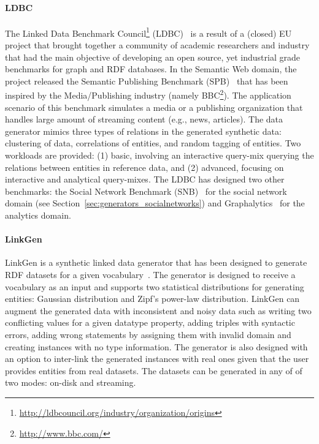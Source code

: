 \paragraph{LDBC}  The Linked Data Benchmark Council\footnote{\url{http://ldbcouncil.org/industry/organization/origins}} (LDBC)~\cite{Angles:2014:LDB:2627692.2627697} is a result of a (closed) EU project that brought together a community of academic researchers and industry that had the main objective of developing an open source, yet industrial grade benchmarks for graph and RDF databases. \iffalse The following three benchmarks were developed and are currently maintained.\fi In the Semantic Web domain, the project released the Semantic Publishing Benchmark (SPB)~\cite{spb} that has been inspired by the Media/Publishing industry (namely BBC\footnote{\url{http://www.bbc.com/}}). The application scenario of this benchmark simulates a media or a publishing organization that handles large amount of streaming content (e.g., news, articles). \iffalse This content is enriched with metadata that describes it and links it to reference knowledge -- taxonomies and databases that include relevant concepts, entities and factual information. The SPB data generator produces scalable in size synthetic large data. Synthetic data consists of a large number of annotations of media assets that refer entities found in reference datasets.\fi The data generator mimics three types of relations in the generated synthetic data: clustering of data, correlations of entities, and random tagging of entities. Two workloads are provided: (1) basic, involving an interactive query-mix querying the relations between entities in reference data, and (2) advanced,  focusing on interactive and analytical query-mixes. The LDBC has designed two other benchmarks: the Social Network Benchmark (SNB)~\cite{Erling:2015:LSN:2723372.2742786} for the social network domain  (see Section~\ref{sec:generators_socialnetworks}) and Graphalytics~\cite{Iosup:2016:LGB:3007263.3007270}   for the analytics domain.%



\paragraph{LinkGen} LinkGen is a synthetic linked data generator that has been designed to generate RDF datasets for a given vocabulary~\cite{10.1007/978-3-319-46547-0_12}. The generator is designed to receive a vocabulary as an input  and supports two statistical distributions for generating entities: Gaussian distribution and Zipf's power-law distribution. LinkGen can augment the generated data with inconsistent and noisy  data such as writing two conflicting values for a given datatype property,  adding triples with syntactic errors, adding wrong statements by assigning them with invalid domain and creating instances with no type information. The generator is also designed with  an option to inter-link the generated instances with real ones given that the user provides entities from real datasets. The datasets can be generated in any of of two modes: on-disk and streaming.

